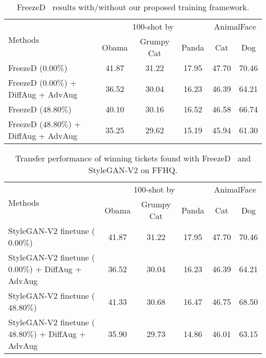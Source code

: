 \documentclass{article}
\begin{document}
\begin{table}[t]
\caption{\small FreezeD~\cite{mo2020freeze} results with/without our proposed training framework.}
\vspace{-2mm}
\label{tab:more_fewshot}
\centering
\small
\begin{tabular}{lccccc} 
\toprule
\multirow{2}{*}{Methods} & \multicolumn{3}{c}{100-shot by \cite{zhao2020diffaugment}} & \multicolumn{2}{c}{AnimalFace} \\ \cmidrule(lr){2-4} \cmidrule(lr){5-6}
& Obama & Grumpy Cat & Panda & Cat & Dog \\ \midrule
FreezeD ($0.00\%$) & 41.87 & 31.22 & 17.95 & 47.70 & 70.46\\ 
FreezeD ($0.00\%$) + DiffAug + AdvAug & 36.52 & 30.04 & 16.23 & 46.39 & 64.21\\ 
FreezeD ($48.80\%$) & 40.10 & 30.16 & 16.52 & 46.58 & 66.74\\ 
FreezeD ($48.80\%$) + DiffAug + AdvAug & 35.25 & 29.62 & 15.19 & 45.94 & 61.30\\ 
\bottomrule
\end{tabular}
\vspace{-1.5mm}
\end{table}

\begin{table}[t]
\caption{\small Transfer performance of winning tickets found with FreezeD~\cite{mo2020freeze} and StyleGAN-V2 on FFHQ.}
\vspace{-2mm}
\label{tab:transfer}
\centering
\small
\begin{tabular}{lccccc} 
\toprule
\multirow{2}{*}{Methods} & \multicolumn{3}{c}{100-shot by \cite{zhao2020diffaugment}} & \multicolumn{2}{c}{AnimalFace} \\ \cmidrule(lr){2-4} \cmidrule(lr){5-6}
& Obama & Grumpy Cat & Panda & Cat & Dog \\ \midrule
StyleGAN-V2 finetune ($0.00\%$) & 41.87 & 31.22 & 17.95 & 47.70 & 70.46\\ 
StyleGAN-V2 finetune ($0.00\%$) + DiffAug + AdvAug & 36.52 & 30.04 & 16.23 & 46.39 & 64.21\\ 
StyleGAN-V2 finetune ($48.80\%$) & 41.33 & 30.68 & 16.47 & 46.75 & 68.50\\ 
StyleGAN-V2 finetune ($48.80\%$) + DiffAug + AdvAug & 35.90 & 29.73 & 14.86 & 46.01 & 63.15 \\ 
\bottomrule
\end{tabular}
\vspace{-1.5mm}
\end{table}
\end{document}
